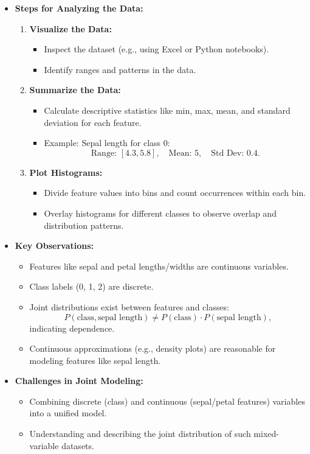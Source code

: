 \documentclass{article}
\begin{document}
\begin{itemize}
  \item \textbf{Steps for Analyzing the Data:}
    \begin{enumerate}
      \item \textbf{Visualize the Data:}
        \begin{itemize}
          \item Inspect the dataset (e.g., using Excel or Python notebooks).
          \item Identify ranges and patterns in the data.
        \end{itemize}
      \item \textbf{Summarize the Data:}
        \begin{itemize}
          \item Calculate descriptive statistics like min, max, mean, and standard deviation for each feature.
          \item Example: Sepal length for class 0:
            \[
              \text{Range: } [4.3, 5.8], \quad \text{Mean: } 5, \quad \text{Std Dev: } 0.4.
            \]
        \end{itemize}
      \item \textbf{Plot Histograms:}
        \begin{itemize}
          \item Divide feature values into bins and count occurrences within each bin.
          \item Overlay histograms for different classes to observe overlap and distribution patterns.
        \end{itemize}
    \end{enumerate}

  \item \textbf{Key Observations:}
    \begin{itemize}
      \item Features like sepal and petal lengths/widths are continuous variables.
      \item Class labels (0, 1, 2) are discrete.
      \item Joint distributions exist between features and classes:
        \[
          P(\text{class}, \text{sepal length}) \neq P(\text{class}) \cdot P(\text{sepal length}),
        \]
        indicating dependence.
      \item Continuous approximations (e.g., density plots) are reasonable for modeling features like sepal length.
    \end{itemize}

  \item \textbf{Challenges in Joint Modeling:}
    \begin{itemize}
      \item Combining discrete (class) and continuous (sepal/petal features) variables into a unified model.
      \item Understanding and describing the joint distribution of such mixed-variable datasets.
    \end{itemize}
\end{itemize}
\end{document}

